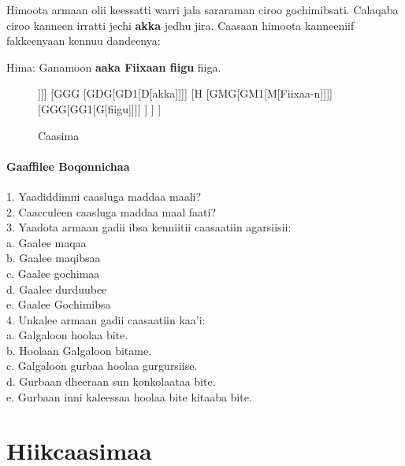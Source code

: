 \documentclass[11pt,b5paper]{book}
\begin{document}
Himoota armaan olii keessatti warri jala sararaman ciroo gochimibsati. Calaqaba ciroo kanneen irratti jechi \textbf{akka} jedhu jira. Caasaan himoota kanneeniif fakkeenyaan kennuu dandeenya: 

Hima: Ganamoon \textbf{aaka Fiixaan fiigu} fiiga.


\begin{figure}[H]
	\caption{Caasima}
	\centering
	\begin{forest}
		[H
			[GMG [GM1[M[Ganamoo-n]]]]
			[GGG
				[GDG[GD1[D[akka]]]]
				[H
					[GMG[GM1[M[Fiixaa-n]]]]
					[GGG[GG1[G[fiigu]]]]
				]
			]
		]
	\end{forest}
\end{figure}

\subsubsection{Gaaffilee Boqonnichaa }

1. Yaadiddimni caasluga maddaa maali?\\
2. Caacculeen caasluga maddaa maal faati?\\
3. Yaadota armaan gadii ibsa kenniitii caasaatiin agarsiisii:\\
	a. Gaalee maqaa\\
	b. Gaalee maqibsaa\\
	c. Gaalee gochimaa\\
	d. Gaalee durduubee\\
	e. Gaalee Gochimibsa\\
4. Unkalee armaan gadii caasaatiin kaa’i:\\
	a. Galgaloon hoolaa bite.\\
	b. Hoolaan Galgaloon bitame.\\
	c. Galgaloon gurbaa hoolaa gurgursiise.\\
	d. Gurbaan dheeraan sun konkolaataa bite.\\
	e. Gurbaan inni kaleessaa hoolaa bite kitaaba bite.
	
	\newpage
	
\chapter{Hiikcaasimaa}
\end{document}
